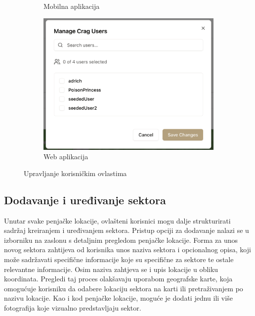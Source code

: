 \begin{figure}[H]
\begin{subfigure}[b]{0.36\textwidth}
        \caption{Mobilna aplikacija}
        \label{fig:upravljanje_ovlastima_mob}
    \end{subfigure}
    \hfill
    \begin{subfigure}[b]{0.6\textwidth}
        \centering
        \includegraphics[width=\textwidth]{images/implementacija/web/editing-options/manage-users.png}
        \caption{Web aplikacija}
        \label{fig:upravljanje_ovlastima_web}
    \end{subfigure}
    \caption{Upravljanje korisničkim ovlastima}
    \label{fig:upravljanje_ovlastima}
\end{figure}


\subsection{Dodavanje i uređivanje sektora}

Unutar svake penjačke lokacije, ovlašteni korisnici mogu dalje strukturirati sadržaj kreiranjem i uređivanjem sektora. Pristup opciji za dodavanje nalazi se u izborniku na zaslonu s detaljnim pregledom penjačke lokacije. Forma za unos novog sektora zahtijeva od korisnika unos naziva sektora i opcionalnog opisa, koji može sadržavati specifične informacije koje su specifične za sektore te ostale relevantne informacije. Osim naziva zahtjeva se i upis lokacije u obliku koordinata. Pregledi taj proces olakšavaju uporabom geografske karte, koja omogućuje korisniku da odabere lokaciju sektora na karti ili pretraživanjem po nazivu lokacije. Kao i kod penjačke lokacije, moguće je dodati jednu ili više fotografija koje vizualno predstavljaju sektor.


